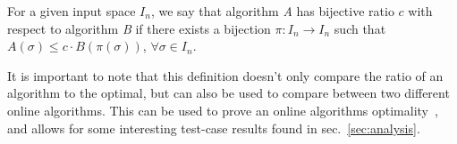 \begin{definition}
    \label{def:bij}
    For a given input space $I_n$, we say that algorithm \textit{A} has bijective ratio $c$ with respect to algorithm \textit{B} if there exists a bijection $\pi:I_n \rightarrow I_n$ such that $A(\sigma) \leq c\cdot B(\pi(\sigma))$, $\forall \sigma \in I_n$. 
\end{definition}

It is important to note that this definition doesn't only compare the ratio of an algorithm to the optimal, but can also be used to compare between two different online algorithms. This can be used to prove an online algorithms optimality~\cite{bij2016}, and allows for some interesting test-case results found in sec.~\ref{sec:analysis}.
